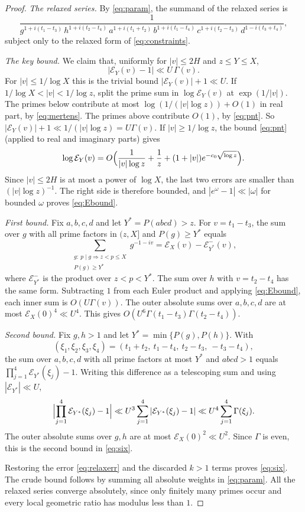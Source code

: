 \documentclass[11pt]{amsart}
\theoremstyle{remark}
\numberwithin{equation}{section}
\begin{document}
\begin{proof}
\emph{The relaxed series.} By \eqref{eq:param}, the summand of the relaxed series is
\begin{equation}\label{eq:sixfactors}
\frac{1}{g^{1+i(t_1-t_3)}\,h^{1+i(t_2-t_4)}\,a^{1+i(t_1+t_2)}\,b^{1+i(t_1-t_4)}\,c^{1+i(t_2-t_3)}\,d^{1-i(t_3+t_4)}} ,
\end{equation}
subject only to the relaxed form of \eqref{eq:constraints}.

\emph{The key bound.} We claim that, uniformly for $|v|\le2H$ and $z\le Y\le X$,
\begin{equation}\label{eq:Ebound}
|\mathcal E_Y(v)-1|\ll U\,\Gamma(v).
\end{equation}
For $|v|\le1/\log X$ this is the trivial bound $|\mathcal E_Y(v)|+1\ll U$. If $1/\log X<|v|<1/\log z$, split the prime sum in $\log\mathcal E_Y(v)$ at $\exp(1/|v|)$. The primes below contribute at most $\log(1/(|v|\log z))+O(1)$ in real part, by \eqref{eq:mertens}. The primes above contribute $O(1)$, by \eqref{eq:pnt}. So $|\mathcal E_Y(v)|+1\ll1/(|v|\log z)=U\Gamma(v)$. If $|v|\ge1/\log z$, the bound \eqref{eq:pnt} (applied to real and imaginary parts) gives
\[
\log\mathcal E_Y(v)=O\Bigl(\frac{1}{|v|\log z}+\frac1z+(1+|v|)e^{-c_0\sqrt{\log z}}\Bigr).
\]
Since $|v|\le2H$ is at most a power of $\log X$, the last two errors are smaller than $(|v|\log z)^{-1}$. The right side is therefore bounded, and $|e^\omega-1|\ll|\omega|$ for bounded $\omega$ proves \eqref{eq:Ebound}.

\emph{First bound.} Fix $a,b,c,d$ and let $Y^*=P(abcd)>z$. For $v=t_1-t_3$, the sum over $g$ with all prime factors in $(z,X]$ and $P(g)\ge Y^*$ equals
\[
\sum_{\substack{g:\ p\mid g\Rightarrow z<p\le X\\ P(g)\ge Y^*}}g^{-1-iv}=\mathcal E_X(v)-\mathcal E^-_{Y^*}(v),
\]
where $\mathcal E^-_{Y^*}$ is the product over $z<p<Y^*$. The sum over $h$ with $v=t_2-t_4$ has the same form. Subtracting $1$ from each Euler product and applying \eqref{eq:Ebound}, each inner sum is $O(U\Gamma(v))$. The outer absolute sums over $a,b,c,d$ are at most $\mathcal E_X(0)^4\ll U^4$. This gives $O(U^6\Gamma(t_1-t_3)\Gamma(t_2-t_4))$.

\emph{Second bound.} Fix $g,h>1$ and let $Y^*=\min\{P(g),P(h)\}$. With
\[
(\xi_1,\xi_2,\xi_3,\xi_4)=(t_1+t_2,\ t_1-t_4,\ t_2-t_3,\ -t_3-t_4),
\]
the sum over $a,b,c,d$ with all prime factors at most $Y^*$ and $abcd>1$ equals $\prod_{j=1}^4\mathcal E_{Y^*}(\xi_j)-1$. Writing this difference as a telescoping sum and using $|\mathcal E_{Y^*}|\ll U$,
\[
\Bigl|\prod_{j=1}^4\mathcal E_{Y^*}(\xi_j)-1\Bigr|\ll U^3\sum_{j=1}^4|\mathcal E_{Y^*}(\xi_j)-1|\ll U^4\sum_{j=1}^4\Gamma(\xi_j).
\]
The outer absolute sums over $g,h$ are at most $\mathcal E_X(0)^2\ll U^2$. Since $\Gamma$ is even, this is the second bound in \eqref{eq:six}.

Restoring the error \eqref{eq:relaxerr} and the discarded $k>1$ terms proves \eqref{eq:six}. The crude bound follows by summing all absolute weights in \eqref{eq:param}. All the relaxed series converge absolutely, since only finitely many primes occur and every local geometric ratio has modulus less than $1$.
\end{proof}
\end{document}
